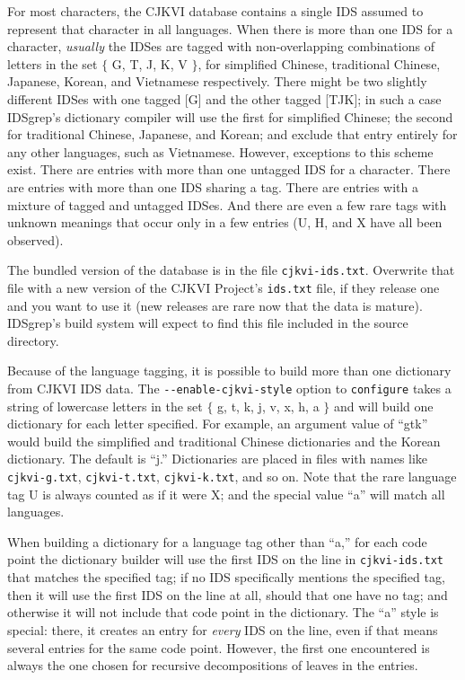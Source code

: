 \documentclass[twocolumn]{report}
\begin{document}
For most characters, the CJKVI database contains a single IDS assumed to
represent that character in all languages.  When there is more than one IDS
for a character, \emph{usually} the IDSes are tagged with non-overlapping
combinations of letters in the set $\{$ G, T, J, K, V $\}$, for simplified
Chinese, traditional Chinese, Japanese, Korean, and Vietnamese respectively. 
There might be two slightly different IDSes with one tagged [G] and the
other tagged [TJK]; in such a case IDSgrep's dictionary compiler will use
the first for simplified Chinese; the second for traditional Chinese,
Japanese, and Korean; and exclude that entry entirely for any other
languages, such as Vietnamese.  However, exceptions to this scheme exist. 
There are entries with more than one untagged IDS for a character.  There
are entries with more than one IDS sharing a tag.  There are entries with a
mixture of tagged and untagged IDSes.  And there are even a few rare tags
with unknown meanings that occur only in a few entries (U, H, and X have all
been observed).

The bundled version of the database is in the file \texttt{cjkvi-ids.txt}. 
Overwrite that file with a new version of the CJKVI Project's
\texttt{ids.txt} file, if they release one and you want to use it (new
releases are rare now that the data is mature).  IDSgrep's build system will
expect to find this file included in the source directory.

Because of the language tagging, it is possible to build more than one
dictionary from CJKVI IDS data.  The \texttt{-{}-enable-cjkvi-style} option
to \texttt{configure} takes a string of lowercase letters in the set $\{$ g,
t, k, j, v, x, h, a $\}$ and will build one dictionary for each letter
specified.  For example, an argument value of ``gtk'' would build the
simplified and traditional Chinese dictionaries and the Korean dictionary. 
The default is ``j.'' Dictionaries are placed in files with names like
\texttt{cjkvi-g.txt}, \texttt{cjkvi-t.txt}, \texttt{cjkvi-k.txt}, and so on. 
Note that the rare language tag U is always counted as if it were X; and the
special value ``a'' will match all languages.

When building a dictionary
for a language tag other than ``a,'' for each code point the
dictionary builder will use the first IDS on the line in
\texttt{cjkvi-ids.txt} that matches the specified tag; if no IDS
specifically mentions the specified tag, then it will use the first IDS on
the line at all, should that one have no tag; and otherwise it will not
include that code point in the dictionary.  The ``a'' style is special:
there, it creates an entry for \emph{every} IDS on the line, even if that
means several entries for the same code point.  However, the first one
encountered is always the one chosen for recursive decompositions of leaves
in the entries.
\end{document}
